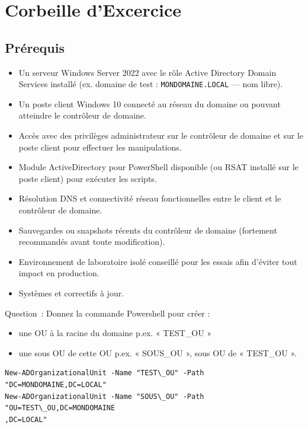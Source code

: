 \newpage

\section*{Corbeille d'Excercice}
\subsection*{Prérequis}
{}
\noindent
\begin{itemize}
	\item Un serveur Windows Server 2022 avec le rôle Active Directory Domain Services installé (ex. domaine de test : \texttt{MONDOMAINE.LOCAL} — nom libre).
	\item Un poste client Windows 10 connecté au réseau du domaine ou pouvant atteindre le contrôleur de domaine.
	\item Accès avec des privilèges administrateur sur le contrôleur de domaine et sur le poste client pour effectuer les manipulations.
	\item Module ActiveDirectory pour PowerShell disponible (ou RSAT installé sur le poste client) pour exécuter les scripts.
	\item Résolution DNS et connectivité réseau fonctionnelles entre le client et le contrôleur de domaine.
	\item Sauvegardes ou snapshots récents du contrôleur de domaine (fortement recommandés avant toute modification).
	\item Environnement de laboratoire isolé conseillé pour les essais afin d'éviter tout impact en production.
	\item Systèmes et correctifs à jour.
\end{itemize}

\vspace{0.5cm}

\noindent Question~: Donnez la commande Powershell pour créer :
\begin{itemize}
	\item une OU à la racine du domaine p.ex. « TEST\_OU »
	\item une sous OU de cette OU p.ex. « SOUS\_OU », sous OU de « TEST\_OU ».
\end{itemize}

\vspace{0.5cm}

\begin{verbatim}
New-ADOrganizationalUnit -Name "TEST\_OU" -Path "DC=MONDOMAINE,DC=LOCAL"
New-ADOrganizationalUnit -Name "SOUS\_OU" -Path "OU=TEST\_OU,DC=MONDOMAINE
,DC=LOCAL"
\end{verbatim}

